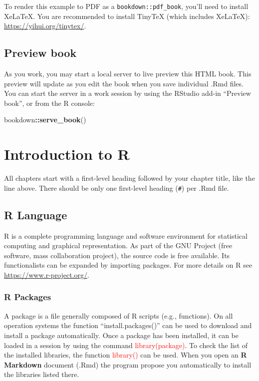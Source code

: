 \documentclass[
]{book}
\newenvironment{Shaded}{\begin{snugshade}}{\end{snugshade}}
\newcommand{\FunctionTok}[1]{\textcolor[rgb]{0.13,0.29,0.53}{\textbf{#1}}}
\newcommand{\NormalTok}[1]{#1}
\newcommand{\SpecialCharTok}[1]{\textcolor[rgb]{0.81,0.36,0.00}{\textbf{#1}}}
\theoremstyle{definition}
\theoremstyle{definition}
\theoremstyle{definition}
\theoremstyle{definition}
\theoremstyle{remark}
\begin{document}
To render this example to PDF as a \texttt{bookdown::pdf\_book}, you'll need to install XeLaTeX. You are recommended to install TinyTeX (which includes XeLaTeX): \url{https://yihui.org/tinytex/}.

\hypertarget{preview-book}{%
\section{Preview book}\label{preview-book}}

As you work, you may start a local server to live preview this HTML book. This preview will update as you edit the book when you save individual .Rmd files. You can start the server in a work session by using the RStudio add-in ``Preview book'', or from the R console:

\begin{Shaded}
\begin{Highlighting}[]
\NormalTok{bookdown}\SpecialCharTok{::}\FunctionTok{serve\_book}\NormalTok{()}
\end{Highlighting}
\end{Shaded}

\hypertarget{introduction-to-r}{%
\chapter{Introduction to R}\label{introduction-to-r}}

All chapters start with a first-level heading followed by your chapter title, like the line above. There should be only one first-level heading (\texttt{\#}) per .Rmd file.

\hypertarget{r-language}{%
\section{R Language}\label{r-language}}

R is a complete programming language and software environment for statistical computing and graphical representation.
As part of the GNU Project (free software, mass collaboration project), the source code is free available.
Its functionalists can be expanded by importing packages.
For more details on R see \url{https://www.r-project.org/}.

\hypertarget{r-packages}{%
\subsection{R Packages}\label{r-packages}}

A package is a file generally composed of R scripts (e.g., functions).
On all operation systems the function ``install.packages()'' can be used to download and install a package automatically.
Once a package has been installed, it can be loaded in a session by using the command \textcolor{red}{library(package)}.
To check the list of the installed libraries, the function \textcolor{red}{library()} can be used.
When you open an \textbf{R Markdown} document (.Rmd) the program propose you automatically to install the libraries listed there.
\end{document}
